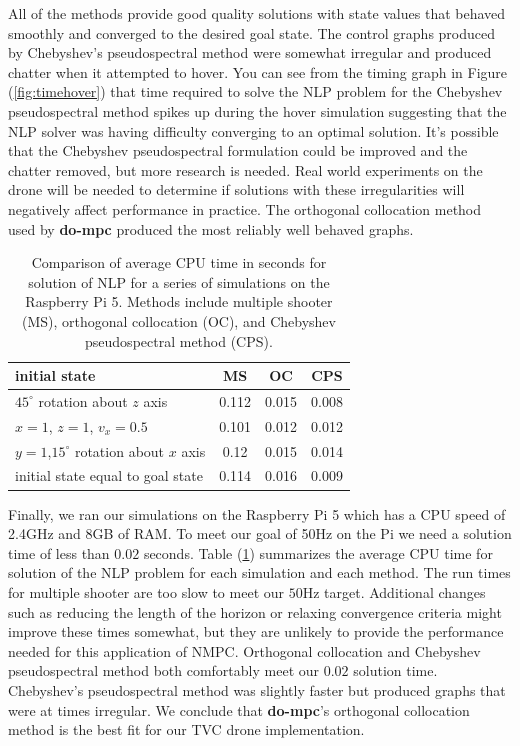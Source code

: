 \documentclass[]{article}
\newcommand{\dompc}{{\bf do-mpc}}
\begin{document}
All of the methods provide good quality solutions with state values that behaved smoothly and converged to the desired goal state.  The control graphs produced by Chebyshev's pseudospectral method were somewhat irregular and produced chatter when it attempted to hover. You can see from the timing graph in Figure (\ref{fig:timehover}) that time required to solve the NLP problem for the Chebyshev pseudospectral method spikes up during the hover simulation suggesting that the NLP solver was having difficulty converging to an optimal solution. It's possible that the Chebyshev pseudospectral formulation could be improved and the chatter removed, but more research is needed. Real world experiments on the drone will be needed to determine if solutions with these irregularities will negatively affect performance in practice. The orthogonal collocation method used by {\dompc} produced the most reliably well behaved graphs.  




\begin{table}[h!]	
	\begin{center}
		\begin{tabular}{ | l | c | c | c | } 
			\hline
			initial state & MS & OC & CPS \\
			\hline
			$45^{\circ}$ rotation about $z$ axis &      0.112 & 0.015 &   0.008 \\ 
			$x = 1$, $z=1$, $v_x = 0.5$  &        0.101 & 0.012          &  0.012 \\ 
			$y = 1$,$15^{\circ}$ rotation about $x$ axis &      0.12 & 0.015          & 0.014 \\ 
				initial state equal to goal state &            0.114  & 0.016    & 0.009 \\ 
			\hline
		\end{tabular}
		\caption{Comparison of average CPU time in seconds for solution of NLP for a series of  simulations on the Raspberry Pi 5. Methods include  multiple shooter (MS), orthogonal collocation (OC), and Chebyshev pseudospectral method (CPS). }
		\label{table:CPU}
	\end{center}

\end{table}

Finally, we ran our simulations on the Raspberry Pi 5 which has a CPU speed of 2.4GHz and 8GB of RAM. To meet our goal of 50Hz on the Pi we need a solution time of less than $0.02$ seconds. Table (\ref{table:CPU}) summarizes the average CPU time for solution of the NLP problem for each simulation and each method.  
The run times for multiple shooter are too slow to meet our  $50$Hz target.  Additional changes such as reducing the length of the horizon or relaxing convergence criteria might improve these times somewhat, but they are unlikely to provide the performance needed for this application of NMPC.  Orthogonal collocation and  Chebyshev pseudospectral method both comfortably  meet our $0.02$ solution time. Chebyshev's pseudospectral method was slightly faster but produced graphs that were at times irregular.  We conclude that {\dompc}'s orthogonal collocation method is the best fit for our TVC drone implementation.
\end{document}
